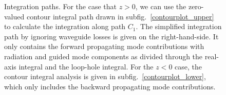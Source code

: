 \begin{figure}
\begin{minipage}{.91\linewidth}
\centering
{}
\end{minipage}
\par\medskip
\begin{minipage}{.91\linewidth}
\centering
{}
\end{minipage}
\caption{Integration paths. For the case that $ z>0 $, we can use the zero-valued contour integral path drawn in subfig.~\ref{contourplot_upper} to calculate the integration along path $ C_1 $. The simplified integration path by ignoring waveguide losses is given on the right-hand-side. It only contains the forward propagating mode contributions with radiation and guided mode components as divided through the real-axis integral and the loop-hole integral. For the $ z<0 $ case, the contour integral analysis is given in subfig.~\ref{contourplot_lower}, which only includes the backward propagating mode contributions.}
\label{fig:integralpath}
\end{figure}

